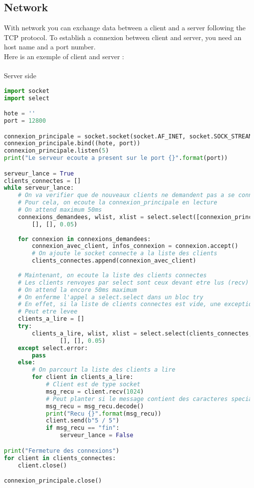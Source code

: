 \documentclass[a4paper, 12pt, titlepage]{scrartcl} %
\begin{document}
\subsection{Network}
With network you can exchange data between a client and a server following the TCP protocol. To establish a connexion between client and server, you need an host name and a port number. \\
Here is an exemple of client and server : \\ \\
Server side
\begin{lstlisting}[language=Python]
import socket
import select

hote = ''
port = 12800

connexion_principale = socket.socket(socket.AF_INET, socket.SOCK_STREAM)
connexion_principale.bind((hote, port))
connexion_principale.listen(5)
print("Le serveur ecoute a present sur le port {}".format(port))

serveur_lance = True
clients_connectes = []
while serveur_lance:
    # On va verifier que de nouveaux clients ne demandent pas a se connecter
    # Pour cela, on ecoute la connexion_principale en lecture
    # On attend maximum 50ms
    connexions_demandees, wlist, xlist = select.select([connexion_principale],
        [], [], 0.05)
    
    for connexion in connexions_demandees:
        connexion_avec_client, infos_connexion = connexion.accept()
        # On ajoute le socket connecte a la liste des clients
        clients_connectes.append(connexion_avec_client)
    
    # Maintenant, on ecoute la liste des clients connectes
    # Les clients renvoyes par select sont ceux devant etre lus (recv)
    # On attend la encore 50ms maximum
    # On enferme l'appel a select.select dans un bloc try
    # En effet, si la liste de clients connectes est vide, une exception
    # Peut etre levee
    clients_a_lire = []
    try:
        clients_a_lire, wlist, xlist = select.select(clients_connectes,
                [], [], 0.05)
    except select.error:
        pass
    else:
        # On parcourt la liste des clients a lire
        for client in clients_a_lire:
            # Client est de type socket
            msg_recu = client.recv(1024)
            # Peut planter si le message contient des caracteres speciaux
            msg_recu = msg_recu.decode()
            print("Recu {}".format(msg_recu))
            client.send(b"5 / 5")
            if msg_recu == "fin":
                serveur_lance = False

print("Fermeture des connexions")
for client in clients_connectes:
    client.close()

connexion_principale.close()
\end{lstlisting} \vspace{5mm}
\end{document}
